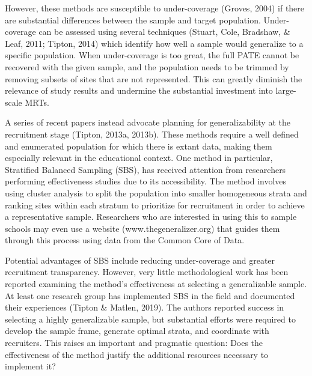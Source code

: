 \documentclass[man,floatsintext]{apa6}
\begin{document}
However, these methods are susceptible to under-coverage (Groves, 2004) if there are substantial differences between the sample and target population. Under-coverage can be assessed using several techniques (Stuart, Cole, Bradshaw, \& Leaf, 2011; Tipton, 2014) which identify how well a sample would generalize to a specific population. When under-coverage is too great, the full PATE cannot be recovered with the given sample, and the population needs to be trimmed by removing subsets of sites that are not represented. This can greatly diminish the relevance of study results and undermine the substantial investment into large-scale MRTs.

A series of recent papers instead advocate planning for generalizability at the recruitment stage (Tipton, 2013a, 2013b). These methods require a well defined and enumerated population for which there is extant data, making them especially relevant in the educational context. One method in particular, Stratified Balanced Sampling (SBS), has received attention from researchers performing effectiveness studies due to its accessibility. The method involves using cluster analysis to split the population into smaller homogeneous strata and ranking sites within each stratum to prioritize for recruitment in order to achieve a representative sample. Researchers who are interested in using this to sample schools may even use a website (www.thegeneralizer.org) that guides them through this process using data from the Common Core of Data.

Potential advantages of SBS include reducing under-coverage and greater recruitment transparency. However, very little methodological work has been reported examining the method's effectiveness at selecting a generalizable sample. At least one research group has implemented SBS in the field and documented their experiences (Tipton \& Matlen, 2019). The authors reported success in selecting a highly generalizable sample, but substantial efforts were required to develop the sample frame, generate optimal strata, and coordinate with recruiters. This raises an important and pragmatic question: Does the effectiveness of the method justify the additional resources necessary to implement it?
\end{document}
